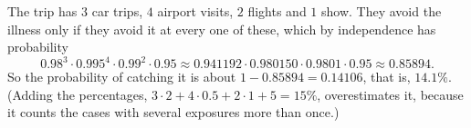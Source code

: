 The trip has $3$ car trips, $4$ airport visits, $2$ flights and $1$ show. They avoid the illness only if they avoid it at every one of these, which by independence has probability
\[0.98^3\cdot0.995^4\cdot0.99^2\cdot0.95\approx0.941192\cdot0.980150\cdot0.9801\cdot0.95\approx0.85894.\]
So the probability of catching it is about $1-0.85894=0.14106$, that is, $\boxed{14.1\%}$. (Adding the percentages, $3\cdot2+4\cdot0.5+2\cdot1+5=15\%$, overestimates it, because it counts the cases with several exposures more than once.)
